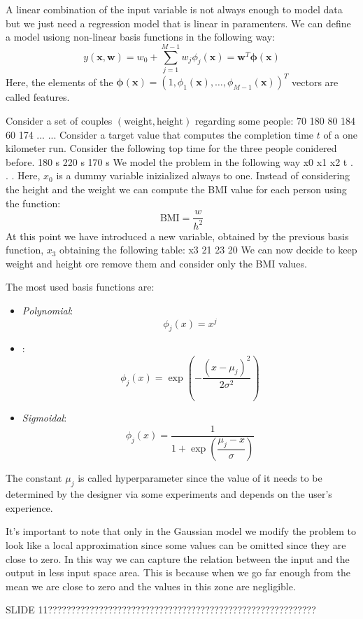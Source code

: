 A linear combination of the input variable is not always enough to model data but we just need a regression model that is linear in paramenters. 
We can define a model usiong non-linear basis functions in the following way: 
\[y(\textbf{x},\textbf{w})=w_0+\sum_{j=1}^{M-1}w_j \phi_j(\textbf{x})=\textbf{w}^T\boldsymbol{\phi}(\textbf{x})\]
Here, the elements of the $\boldsymbol{\phi}(\textbf{x})=\left( 1,\phi_1(\textbf{x}),\dots,\phi_{M-1}(\textbf{x}) \right)^T$ vectors are called features. 
\begin{example}
    Consider a set of couples $(\text{weight}, \text{height})$ regarding some people: 
    70  180
    80  184
    60  174
    ... ... 
    Consider a target value that computes the completion time $t$ of a one kilometer run. 
    Consider the following top time for the three people conidered before. 
    180 s 
    220 s 
    170 s 
    We model the problem in the following way 
    x0 x1 x2 t
    .
    .
    .
    Here, $x_0$ is a dummy variable inizialized always to one. 
    Instead of considering the height and the weight we can compute the BMI value for each person using the function: 
    \[\text{BMI}=\dfrac{w}{h^2}\]
    At this point we have introduced a new variable, obtained by the previous basis function, $x_3$ obtaining the following table: 
    x3
    21
    23
    20
    We can now decide to keep weight and height ore remove them and consider only the BMI values. 
\end{example}
The most used basis functions are: 
\begin{itemize}
    \item \textit{Polynomial}: 
        \[\phi_j(x)=x^j\]
    \item {}:
        \[\phi_j(x)=\exp \left( -\dfrac{\left( x-\mu_j \right)^2}{2 \sigma^2} \right) \]
    \item \textit{Sigmoidal}: 
        \[\phi_j(x)=\dfrac{1}{1+\exp\left(\dfrac{\mu_j-x}{\sigma}\right)}\]
\end{itemize}
The constant $\mu_j$ is called hyperparameter since the value of it needs to be determined by the designer via some experiments and depends on the user's experience. 

It's important to note that only in the Gaussian model we modify the problem to look like a local approximation since some values can be omitted since they are close to zero. 
In this way we can capture the relation between the input and the output in less input space area. 
This is because when we go far enough from the mean we are close to zero and the values in this zone are negligible. 

SLIDE 11??????????????????????????????????????????????????????????











